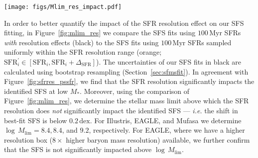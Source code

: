 \documentclass[tighten, preprint]{aastex62}
\begin{document}
\begin{figure*}
\begin{center}
\texttt{[image: figs/Mlim\_res\_impact.pdf]} 
\caption{The resolution effect of $100\,\mathrm{Myr}$ SFRs in the hydrodynamic 
simulations (Illustris, EAGLE, and {\sc Mufasa}) impact the identified SFSs 
at low stellar masses. In black we plot the best-fit SFS 
with the resolution effects. In orange we plot the best-fit SFS where 
the SFR for each galaxy is sampled uniformly within the resolution range: 
$\mathrm{SFR}_i^{\prime} \in [\mathrm{SFR}_i, \mathrm{SFR}_i +
\Delta_\mathrm{SFR}]$). Based on the discrepancy between the fits, we determine 
stellar mass limits above which the SFR resolution does {\em not} 
significantly impact ($< 0.2\,\mathrm{dex}$) the identified SFS. For Illustris, 
EAGLE, and {\sc Mufasa} this corresponds to $\log M_\mathrm{lim} = 8.4, 8.4$, 
and $9.2$, respectively.} 
\label{fig:mlim_res}
\end{center}
\end{figure*}
In order to better quantify the impact of the SFR resolution effect
on our SFS fitting, in Figure~\ref{fig:mlim_res} we compare the SFS fits 
using $100\,\mathrm{Myr}$ SFRs \emph{with} resolution effects (black) to 
the SFS fits using $100\,\mathrm{Myr}$ SFRs sampled uniformly within the 
SFR resolution range (orange; 
$\mathrm{SFR}_i^{\prime} \in [\mathrm{SFR}_i, \mathrm{SFR}_i + \Delta_\mathrm{SFR}]$). 
The uncertainties of our SFS fits in black are calculated using bootstrap 
resampling (Section~\ref{sec:sfmsfit}). In agreement with 
Figure~\ref{fig:sfrres_pssfr}, we find that the SFR resolution 
significantly impacts the identified SFS at low $M_*$. Moreover, using the 
comparison of Figure~\ref{fig:mlim_res}, we determine the stellar mass 
limit above which the SFR resolution does {\em not} significantly impact 
the identified SFS --- \emph{i.e.} the shift in best-fit SFS is below 
$0.2\,\mathrm{dex}$. For Illustris, EAGLE, and {\sc Mufasa} we determine 
$\log\,M_\mathrm{lim} = 8.4, 8.4$, and  $9.2$, respectively. {\color{red} 
For EAGLE, where we have a higher resolution box ($8\times$ higher baryon 
mass resolution) available, we further confirm that the SFS is not significantly impacted above $\log\,M_\mathrm{lim}$.}
\end{document}
